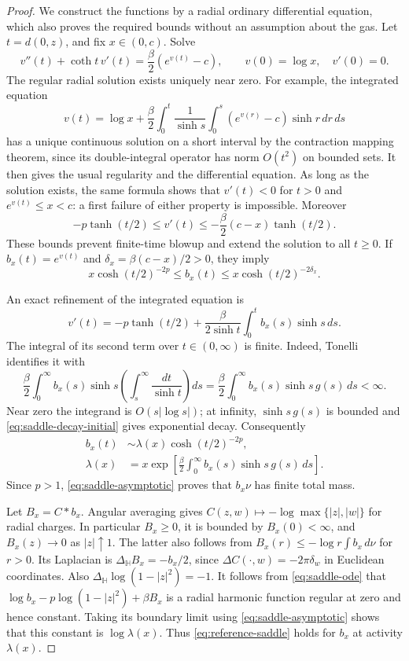 \documentclass[11pt]{article}
\theoremstyle{remark}\newtheorem{remark}[theorem]{Remark}
\begin{document}
\begin{proof}
We construct the functions by a radial ordinary differential equation,
which also proves the required bounds without an assumption about the
gas.  Let $t=d(0,z)$, and fix $x\in(0,c)$.  Solve
\begin{equation}\label{eq:saddle-ode}
 v''(t)+\coth t\,v'(t)=\frac\beta2(e^{v(t)}-c),\qquad
 v(0)=\log x,\quad v'(0)=0.
\end{equation}
The regular radial solution exists uniquely near zero.  For example,
the integrated equation
\[
 v(t)=\log x+\frac\beta2\int_0^t\frac1{\sinh s}
                  \int_0^s(e^{v(r)}-c)\sinh r\,dr\,ds
\]
has a unique continuous solution on a short interval by the contraction
mapping theorem, since its double-integral operator has norm $O(t^2)$
on bounded sets.  It then gives the usual regularity and the differential
equation.  As long as the solution exists, the same formula shows that
$v'(t)<0$ for $t>0$ and $e^{v(t)}\le x<c$: a first failure of either
property is impossible.  Moreover
\[
 -p\tanh(t/2)\le v'(t)
 \le-\frac\beta2(c-x)\tanh(t/2).
\]
These bounds prevent finite-time blowup and extend the solution to all
$t\ge0$.  If $b_x(t)=e^{v(t)}$ and
$\delta_x=\beta(c-x)/2>0$, they imply
\begin{equation}\label{eq:saddle-decay-initial}
 x\cosh(t/2)^{-2p}\le b_x(t)
 \le x\cosh(t/2)^{-2\delta_x}.
\end{equation}

An exact refinement of the integrated equation is
\[
 v'(t)=-p\tanh(t/2)
      +\frac\beta{2\sinh t}\int_0^t b_x(s)\sinh s\,ds.
\]
The integral of its second term over $t\in(0,\infty)$ is finite.
Indeed, Tonelli identifies it with
\[
 \frac\beta2\int_0^\infty b_x(s)\sinh s
                      \left(\int_s^\infty\frac{dt}{\sinh t}\right)ds
 =\frac\beta2\int_0^\infty b_x(s)\sinh s\,g(s)\,ds<\infty.
\]
Near zero the integrand is $O(s|\log s|)$; at infinity,
$\sinh s\,g(s)$ is bounded and \eqref{eq:saddle-decay-initial} gives
exponential decay.  Consequently
\begin{align}
 b_x(t)&\sim\lambda(x)\cosh(t/2)^{-2p},\label{eq:saddle-asymptotic}\\
 \lambda(x)&=x\exp\left[\frac\beta2\int_0^\infty
                    b_x(s)\sinh s\,g(s)\,ds\right].
\end{align}
Since $p>1$, \eqref{eq:saddle-asymptotic} proves that $b_x\nu$ has
finite total mass.

Let $B_x=C*b_x$.  Angular averaging gives
$C(z,w)\mapsto-\log\max\{|z|,|w|\}$ for radial charges.  In
particular $B_x\ge0$, it is bounded by $B_x(0)<\infty$, and
$B_x(z)\to0$ as $|z|\uparrow1$.  The latter also follows from
$B_x(r)\le-\log r\int b_x\,d\nu$ for $r>0$.
Its Laplacian is
$\Delta_{\mathbb H}B_x=-b_x/2$, since
$\Delta C(\cdot,w)=-2\pi\delta_w$ in Euclidean coordinates.
Also $\Delta_{\mathbb H}\log(1-|z|^2)=-1$.
It follows from \eqref{eq:saddle-ode} that
$\log b_x-p\log(1-|z|^2)+\beta B_x$ is a radial harmonic
function regular at zero and hence constant.  Taking its boundary
limit using \eqref{eq:saddle-asymptotic} shows that this constant is
$\log\lambda(x)$.  Thus \eqref{eq:reference-saddle} holds for $b_x$
at activity $\lambda(x)$.


\end{proof}
\end{document}
